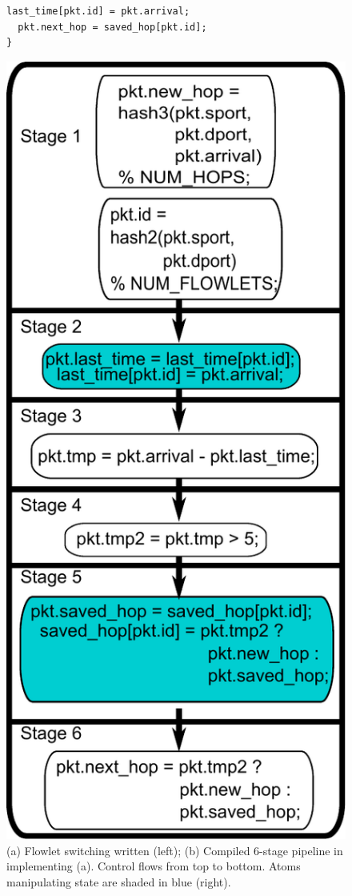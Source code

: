\begin{figure}[!t]
\begin{minipage}{0.6\textwidth}
\begin{small}
\begin{lstlisting}[style=customc]
  last_time[pkt.id] = pkt.arrival;
  pkt.next_hop = saved_hop[pkt.id];
}
\end{lstlisting}
\end{small}
\end{minipage}
%
\vrule\quad
%
\begin{minipage}{0.4\textwidth}
\includegraphics[width=0.8\columnwidth]{pipe.pdf}
\end{minipage}
\caption{\small (a) Flowlet switching written \pktlanguage (left);
(b) Compiled 6-stage pipeline in \absmachine implementing (a).  Control flows
from top to bottom. Atoms manipulating state are shaded in blue (right).}
\label{fig:flowlet}
\end{figure}


